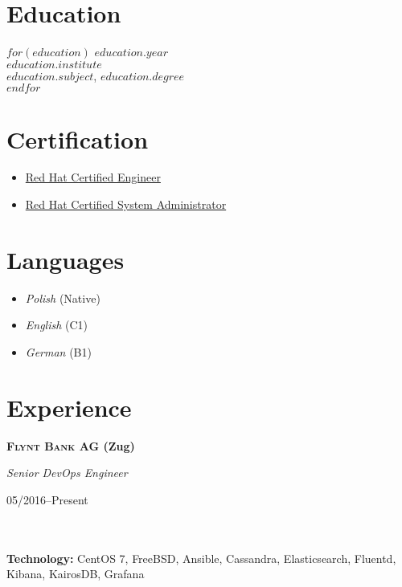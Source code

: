 \documentclass[$fontsize$, a4paper]{article}
\newcommand\textbox[1]{%
  \parbox{.333\textwidth}{#1}%
}
\begin{document}
\begin{multicols}{2}

\section*{Education}
$for(education)$
$education.year$\\
\emph{$education.institute$}\\
\textbf{$education.subject$}, $education.degree$\\

$endfor$

\columnbreak

\section*{Certification}

\begin{itemize}
  \setlength\itemsep{-0.5em}
  \item \href{https://www.redhat.com/rhtapps/certification/verify/?certId=140-054-446}{Red Hat Certified Engineer}
  \item \href{https://www.redhat.com/rhtapps/certification/verify/?certId=140-054-446}{Red Hat Certified System Administrator}
\end{itemize}

\section*{Languages}
\begin{itemize}
  \setlength\itemsep{-0.5em}
  \item \emph{Polish} (Native)
  \item \emph{English} (C1)
  \item \emph{German} (B1)
\end{itemize}

\end{multicols}

\vspace{-10pt}


\section*{Experience}
\noindent

\noindent\textbox{\textbf{\textsc{Flynt Bank AG} (Zug)}\hfill}\textbox{\hfil \emph{Senior DevOps Engineer}\hfil}\textbox{\hfill 05/2016--Present}\\\\
\textbf{Technology:} CentOS 7, FreeBSD, Ansible, Cassandra, Elasticsearch, Fluentd, Kibana, KairosDB, Grafana
\end{document}
